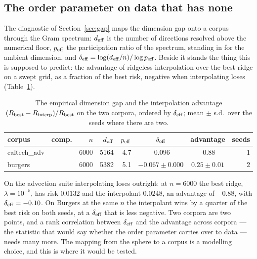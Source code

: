 \documentclass[11pt]{article}
\theoremstyle{definition}
\newcommand{\numAdvAdvantage}{-0.88}
\newcommand{\numAdvBestLam}{10^{-5}}
\newcommand{\numAdvDeltaEff}{-0.10}
\newcommand{\numAdvRiskInterp}{0.0248}
\newcommand{\numAdvRiskRidge}{0.0132}
\begin{document}
\subsection{The order parameter on data that has none}

The diagnostic of Section~\ref{sec:gap} maps the dimension gap onto a corpus through the Gram
spectrum: $d_{\rm eff}$ is the number of directions resolved above the numerical floor,
$p_{\rm eff}$ the participation ratio of the spectrum, standing in for the ambient dimension, and
$\delta_{\rm eff}=\log(d_{\rm eff}/n)/\log p_{\rm eff}$. Beside it stands the thing this is supposed
to predict: the advantage of ridgeless interpolation over the best ridge on a swept grid, as a
fraction of the best risk, negative when interpolating loses (Table~\ref{tab:newcorp}).

\begin{table}[t]
\centering\small
\caption{The empirical dimension gap and the interpolation advantage
$(R_{\rm best}-R_{\rm interp})/R_{\rm best}$ on the two corpora, ordered by $\delta_{\rm eff}$;
mean $\pm$ s.d.\ over the seeds where there are two.}
\label{tab:newcorp}
\begin{tabular}{@{}llrrrccr@{}}
\toprule
corpus & comp. & $n$ & $d_{\rm eff}$ & $p_{\rm eff}$ & $\delta_{\rm eff}$ & advantage & seeds\\
\midrule
caltech\_adv &  & 6000 & 5164 & 4.7 & -0.096 & -0.88 & 1\\
burgers &  & 6000 & 5382 & 5.1 & $-0.067\pm0.000$ & $0.25\pm0.01$ & 2\\
\bottomrule
\end{tabular}
\end{table}

On the advection suite interpolating loses outright: at $n=6000$ the best ridge,
$\lambda=\numAdvBestLam$, has risk $\numAdvRiskRidge$ and the interpolant $\numAdvRiskInterp$, an
advantage of $\numAdvAdvantage$, with $\delta_{\rm eff}=\numAdvDeltaEff$. On Burgers at the same $n$
the interpolant wins by a quarter of the best risk on both seeds, at a $\delta_{\rm eff}$ that is
less negative. Two corpora are two points, and a rank correlation between $\delta_{\rm eff}$ and the
advantage across corpora --- the statistic that would say whether the order parameter carries over
to data --- needs many more. The mapping from the sphere to a corpus is a modelling choice, and this
is where it would be tested.
\end{document}
